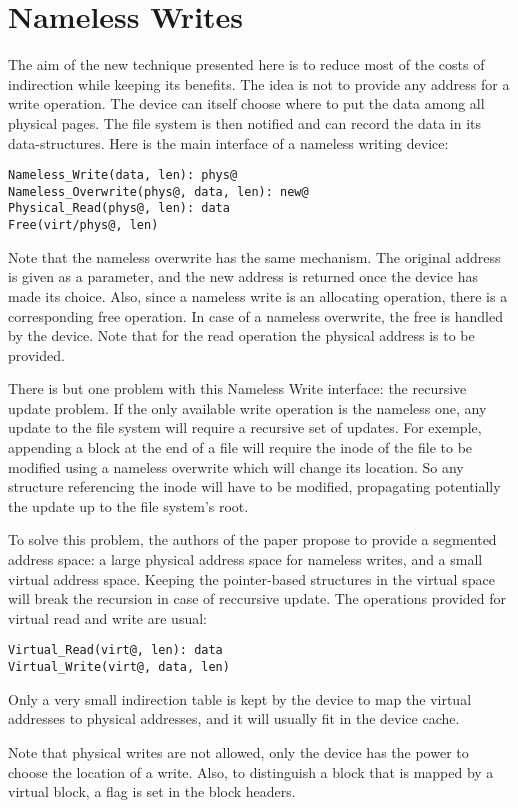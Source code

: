 \documentclass[twocolumn,a4paper,10pt]{article}
\begin{document}
\section*{Nameless Writes}
The aim of the new technique presented here is to reduce most of the costs of
indirection while keeping its benefits. The idea is not to provide any address
for a write operation. The device can itself choose where to put the data
among all physical pages. The file system is then notified and can record the
data in its data-structures. Here is the main interface of a nameless writing
device:
\begin{lstlisting}
Nameless_Write(data, len): phys@
Nameless_Overwrite(phys@, data, len): new@
Physical_Read(phys@, len): data
Free(virt/phys@, len)
\end{lstlisting}
Note that the nameless overwrite has the same mechanism. The original address
is given as a parameter, and the new address is returned once the device has
made its choice. Also, since a nameless write is an allocating operation,
there is a corresponding free operation. In case of a nameless overwrite, the
free is handled by the device. Note that for the read operation the physical
address is to be provided.

There is but one problem with this Nameless Write interface: the recursive
update problem. If the only available write operation is the nameless one, any
update to the file system will require a recursive set of updates. For
exemple, appending a block at the end of a file will require the inode of the
file to be modified using a nameless overwrite which will change its location.
So any structure referencing the inode will have to be modified, propagating
potentially the update up to the file system's root.

To solve this problem, the authors of the paper propose to provide a segmented
address space: a large physical address space for nameless writes, and a small
virtual address space. Keeping the pointer-based structures in the virtual
space will break the recursion in case of reccursive update. The operations
provided for virtual read and write are usual:
\begin{lstlisting}
Virtual_Read(virt@, len): data
Virtual_Write(virt@, data, len)
\end{lstlisting}
Only a very small indirection table is kept by the device to map the virtual
addresses to physical addresses, and it will usually fit in the device cache.

Note that physical writes are not allowed, only the device has the power to
choose the location of a write. Also, to distinguish a block that is mapped by
a virtual block, a flag is set in the block headers.
\end{document}
